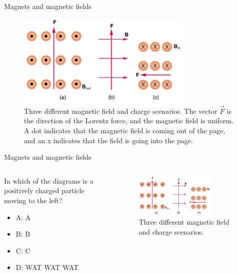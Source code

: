 \documentclass{beamer}
\begin{document}
\begin{frame}{Magnets and magnetic fields}
\begin{figure}
\centering
\includegraphics[width=0.75\textwidth]{figures/lorentzProblem.png}
\caption{\label{fig:lorentzProblem} Three different magnetic field and charge scenarios. The
vector $\vec{F}$ is the direction of the Lorentz force, and the magnetic field
is uniform. A dot indicates that the magnetic field is coming out of
the page, and an x indicates that the field is going into the page.}
\end{figure}
\end{frame}

\begin{frame}{Magnets and magnetic fields}
\begin{columns}[T]
\begin{column}{0.3\textwidth}
In which of the diagrams is a positively charged particle moving to the left?
\begin{itemize}
\item A: A
\item B: B
\item C: C
\item D: WAT WAT WAT
\end{itemize}
\end{column}
\begin{column}{0.7\textwidth}
\begin{figure}
\centering
\includegraphics[width=0.75\textwidth]{figures/lorentzProblem.png}
\caption{\label{fig:lorentzProblem2} Three different magnetic field and charge scenarios.}
\end{figure}
\end{column}
\end{columns}
\end{frame}
\end{document}
